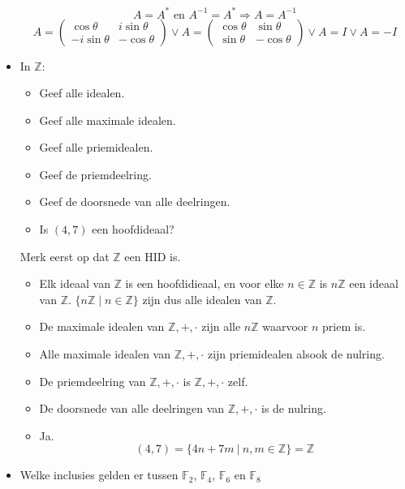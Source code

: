 \documentclass[main.tex]{subfiles}
\begin{document}
\begin{itemize}
   \[ A = A^{*} \text{ en } A^{-1}=A^{*} \Rightarrow A=A^{-1}\]
   \[ A = 
   \begin{pmatrix}
     \cos\theta & i\sin\theta\\
     -i\sin\theta & -\cos\theta
   \end{pmatrix}
   \vee 
   A =
   \begin{pmatrix}
     \cos\theta & \sin\theta\\
     \sin\theta & -\cos\theta
   \end{pmatrix}
   \vee 
   A = I
   \vee 
   A = -I
   \]
 \item In $\mathbb{Z}$:
   \begin{itemize}
   \item Geef alle idealen.
   \item Geef alle maximale idealen.
   \item Geef alle priemidealen.
   \item Geef de priemdeelring.
   \item Geef de doorsnede van alle deelringen.
   \item Is $(4,7)$ een hoofdideaal?
   \end{itemize}

   Merk eerst op dat $\mathbb{Z}$ een HID is.

   \begin{itemize}
   \item Elk ideaal van $\mathbb{Z}$ is een hoofdidieaal, en voor elke $n\in \mathbb{Z}$ is $n\mathbb{Z}$ een ideaal van $\mathbb{Z}$.
     $\{ n\mathbb{Z} \mid n \in \mathbb{Z} \}$ zijn dus alle idealen van $\mathbb{Z}$.
   \item De maximale idealen van $\mathbb{Z},+,\cdot$ zijn alle $n\mathbb{Z}$ waarvoor $n$ priem is.
   \item Alle maximale idealen van $\mathbb{Z},+,\cdot$ zijn priemidealen alsook de nulring.
   \item De priemdeelring van $\mathbb{Z},+,\cdot$ is $\mathbb{Z},+,\cdot$ zelf.
   \item De doorsnede van alle deelringen van $\mathbb{Z},+,\cdot$ is de nulring.
   \item Ja.
     \[ (4,7) = \{ 4n + 7m \ |\ n,m \in \mathbb{Z}  \} = \mathbb{Z} \]
   \end{itemize}

 \item Welke inclusies gelden er tussen $\mathbb{F}_{2}$, $\mathbb{F}_{4}$, $\mathbb{F}_{6}$ en $\mathbb{F}_{8}$


\end{itemize}
\end{document}
